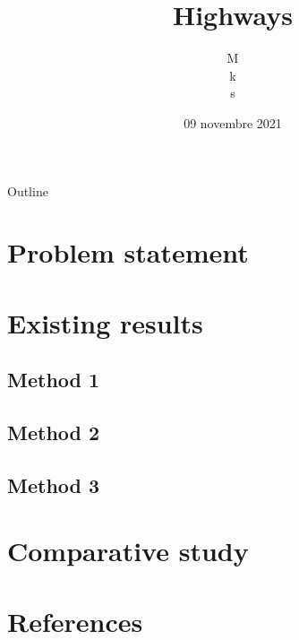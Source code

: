 \documentclass{beamer}
\title{Highways}
\author{M \\  k \\ s}
\date{09 novembre 2021}
\begin{document}
\begin{frame}
    \titlepage 
\end{frame}
\begin{frame}{Outline}
    \tableofcontents
\end{frame}
\section{Problem statement}
\section{Existing results}
    \subsection{Method 1}
    \subsection{Method 2}
    \subsection{Method 3}
\section{Comparative study}
\section*{References}
\begin{frame}
\end{frame}
 
\end{document}
